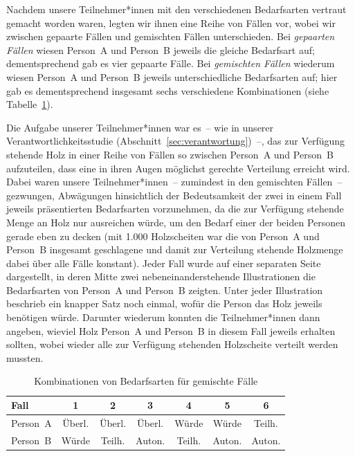 \documentclass[justified,nobib,symmetric,twoside]{tufte-handout}
\begin{document}
Nachdem unsere Teilnehmer*innen mit den verschiedenen Bedarfsarten vertraut gemacht worden waren, legten wir ihnen eine Reihe von Fällen vor, wobei wir zwischen gepaarte Fällen und gemischten Fällen unterschieden.
Bei \textit{gepaarten Fällen} wiesen Person~A und Person~B jeweils die gleiche Bedarfsart auf; dementsprechend gab es vier gepaarte Fälle.
Bei \textit{gemischten Fällen} wiederum wiesen Person~A und Person~B jeweils unterschiedliche Bedarfsarten auf; hier gab es dementsprechend insgesamt sechs verschiedene Kombinationen (siehe Tabelle~\ref{tab:kombinationen}).

Die Aufgabe unserer Teilnehmer*innen war es~-- wie in unserer Verantwortlichkeitsstudie (Abschnitt~\ref{sec:verantwortung})~--, das zur Verfügung stehende Holz in einer Reihe von Fällen so zwischen Person~A und Person~B aufzuteilen, dass eine in ihren Augen möglichst gerechte Verteilung erreicht wird.
Dabei waren unsere Teilnehmer*innen~-- zumindest in den gemischten Fällen~-- gezwungen, Abwägungen hinsichtlich der Bedeutsamkeit der zwei in einem Fall jeweils präsentierten Bedarfsarten vorzunehmen, da die zur Verfügung stehende Menge an Holz nur ausreichen würde, um den Bedarf einer der beiden Personen gerade eben zu decken (mit 1.000 Holzscheiten war die von Person~A und Person~B insgesamt geschlagene und damit zur Verteilung stehende Holzmenge dabei über alle Fälle konstant).
Jeder Fall wurde auf einer separaten Seite dargestellt, in deren Mitte zwei nebeneinanderstehende Illustrationen die Bedarfsarten von Person~A und Person~B zeigten.
Unter jeder Illustration beschrieb ein knapper Satz noch einmal, wofür die Person das Holz jeweils benötigen würde.
Darunter wiederum konnten die Teilnehmer*innen dann angeben, wieviel Holz Person~A und Person~B in diesem Fall jeweils erhalten sollten, wobei wieder alle zur Verfügung stehenden Holzscheite verteilt werden mussten.

\begin{table}[t]
   \caption{Kombinationen von Bedarfsarten für gemischte Fälle}\label{tab:kombinationen}
   \begin{center}
   \begin{tabular}{lcccccc}
   \hline
   Fall       & 1        & 2        & 3        & 4        & 5        & 6        \\
   \hline\hline
   Person~A   & Überl.   & Überl.   & Überl.   & Würde    & Würde    & Teilh.   \\
   Person~B   & Würde    & Teilh.   & Auton.   & Teilh.   & Auton.   & Auton.   \\
   \hline
   \end{tabular}
   \end{center}
\end{table}
\end{document}

